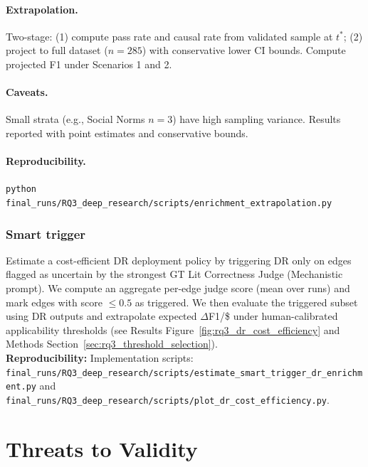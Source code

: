 \paragraph{Extrapolation.}
Two-stage: (1) compute pass rate and causal rate from validated sample at $t^*$; (2) project to full dataset ($n=285$) with conservative lower CI bounds. Compute projected F1 under Scenarios 1 and 2.

\paragraph{Caveats.}
Small strata (e.g., Social Norms $n=3$) have high sampling variance. Results reported with point estimates and conservative bounds.

\paragraph{Reproducibility.}
\texttt{python final\_runs/RQ3\_deep\_research/scripts/enrichment\_extrapolation.py}

\subsubsection{Smart trigger}\label{sec:rq3_smart_trigger}
\noindent Estimate a cost-efficient DR deployment policy by triggering DR only on edges flagged as uncertain by the strongest GT Lit Correctness Judge (Mechanistic prompt). We compute an aggregate per-edge judge score (mean over runs) and mark edges with score $\leq 0.5$ as triggered. We then evaluate the triggered subset using DR outputs and extrapolate expected $\Delta$F1/\$ under human-calibrated applicability thresholds (see Results Figure~\ref{fig:rq3_dr_cost_efficiency} and Methods Section~\ref{sec:rq3_threshold_selection}).\\
\textbf{Reproducibility:} Implementation scripts: \texttt{final\_runs/RQ3\_deep\_research/scripts/estimate\_smart\_trigger\_dr\_enrichment.py} and \texttt{final\_runs/RQ3\_deep\_research/scripts/plot\_dr\_cost\_efficiency.py}.

\endgroup

\section{Threats to Validity}
\label{sec:threats_to_validity}

